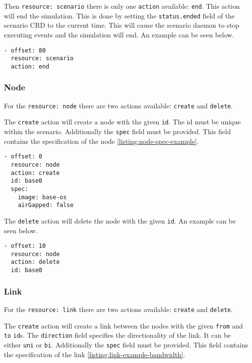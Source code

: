 Then \verb|resource: scenario| there is only one \verb|action| available: \verb|end|. This action will end the simulation. This is done by setting the \verb|status.ended| field of the scenario CRD to the current time. This will cause the scenario daemon to stop executing events and the simulation will end. An example can be seen below.

\begin{verbatim}
- offset: 80
  resource: scenario
  action: end 
\end{verbatim}

\subsubsection{Node}

For the \verb|resource: node| there are two actions available: \verb|create| and \verb|delete|.

The \verb|create| action will create a node with the given \verb|id|. The id must be unique within the scenario. Additionally the \verb|spec| field must be provided. This field contains the specification of the node \ref{listing:node-spec-example}.

\begin{verbatim}
- offset: 0
  resource: node
  action: create
  id: base0
  spec:
    image: base-os
    airGapped: false
\end{verbatim}

The \verb|delete| action will delete the node with the given \verb|id|. An example can be seen below.

\begin{verbatim}
- offset: 10
  resource: node
  action: delete
  id: base0
\end{verbatim}

\subsubsection{Link}

For the \verb|resource: link| there are two actions available: \verb|create| and \verb|delete|.

The \verb|create| action will create a link between the nodes with the given \verb|from| and \verb|to| \verb|id|s.
The \verb|direction| field specifies the directionality of the link. It can be either \verb|uni| or \verb|bi|.
Additionally the \verb|spec| field must be provided. This field contains the specification of the link \ref{listing:link-example-bandwidth}.

